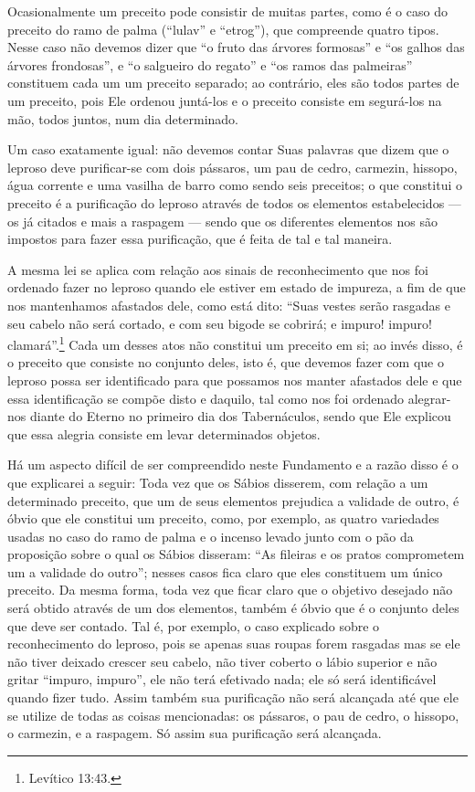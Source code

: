 Ocasionalmente um preceito pode consistir de muitas partes, como é o
caso do preceito do ramo de palma (``lulav'' e ``etrog''), que
compreende quatro tipos. Nesse caso não devemos dizer que ``o fruto das
árvores formosas'' e ``os galhos das árvores frondosas'', e ``o
salgueiro do regato'' e ``os ramos das palmeiras'' constituem cada um
um preceito separado; ao contrário, eles são todos partes de um
preceito, pois Ele ordenou juntá-los e o preceito consiste em segurá-los
na mão, todos juntos, num dia determinado.

Um caso exatamente igual: não devemos contar Suas palavras que dizem que
o leproso deve purificar-se com dois pássaros, um pau de cedro,
carmezin, hissopo, água corrente e uma vasilha de barro como sendo seis
preceitos; o que constitui o preceito é a purificação do leproso
através de todos os elementos estabelecidos --- os já citados e mais a
raspagem --- sendo que os diferentes elementos nos são impostos para
fazer essa purificação, que é feita de tal e tal maneira.

A mesma lei se aplica com relação aos sinais de reconhecimento que nos
foi ordenado fazer no leproso quando ele estiver em estado de impureza,
a fim de que nos mantenhamos afastados dele, como está dito: ``Suas
vestes serão rasgadas e seu cabelo não será cortado, e com seu bigode se
cobrirá; e impuro! impuro! clamará''.\footnote{Levítico 13:43.} Cada um desses
atos não constitui um preceito em si; ao invés disso, é o preceito que
consiste no conjunto deles,
isto é, que devemos fazer com que o leproso possa ser identificado para
que possamos nos manter afastados dele e que essa identificação se
compõe disto e daquilo, tal como nos foi ordenado alegrar-nos diante do
Eterno no primeiro dia dos Tabernáculos, sendo que Ele explicou que essa
alegria consiste em levar determinados objetos.

Há um aspecto difícil de ser compreendido neste Fundamento e a razão
disso é o que explicarei a seguir: Toda vez que os Sábios disserem, com
relação a um determinado preceito, que um de seus elementos prejudica a
validade de outro, é óbvio que ele constitui um preceito, como, por
exemplo, as quatro variedades usadas no caso do ramo de palma e o
incenso levado junto com o pão da proposição sobre o qual os Sábios
disseram: ``As fileiras e os pratos comprometem um a validade do
outro''; nesses casos fica claro que eles constituem um único preceito.
Da mesma forma, toda vez que ficar claro que o objetivo desejado não
será obtido através de um dos elementos, também é óbvio que é o conjunto
deles que deve ser contado. Tal é, por exemplo, o caso explicado sobre o
reconhecimento do leproso, pois se apenas suas roupas forem rasgadas
mas se ele não tiver deixado crescer seu cabelo, não tiver coberto o
lábio superior e não gritar ``impuro, impuro'', ele não terá efetivado
nada; ele só será identificável quando fizer tudo. Assim também sua
purificação não será alcançada até que ele se utilize de todas as coisas
mencionadas: os pássaros, o pau de cedro, o hissopo, o carmezin, e a
raspagem. Só assim sua purificação será alcançada.

